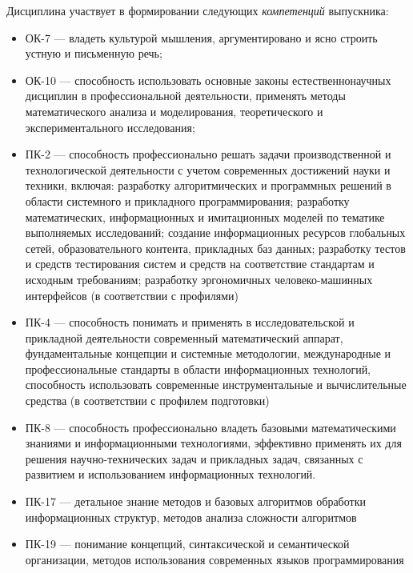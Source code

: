 \documentclass{rpd}
\begin{document}
    \bigskip Дисциплина участвует в формировании следующих \emph{компетенций} выпускника:
    \begin{itemize}
        \item
        ОК-7 --- владеть культурой мышления, аргументировано и ясно строить устную и письменную речь;
        \item
        ОК-10 --- способность использовать основные законы естественнонаучных дисциплин в профессиональной деятельности, применять методы математического анализа и моделирования, теоретического и экспериментального исследования;
        \item
        ПК-2 --- способность профессионально решать задачи производственной и технологической деятельности с учетом современных достижений науки и техники, включая: разработку алгоритмических и программных решений в области системного и прикладного программирования; разработку математических, информационных и имитационных моделей по тематике выполняемых исследований; создание информационных ресурсов глобальных сетей, образовательного контента, прикладных баз данных; разработку тестов и средств тестирования систем и средств на соответствие стандартам и исходным требованиям; разработку  эргономичных человеко-машинных интерфейсов (в соответствии с профилями)
        \item
        ПК-4 --- способность понимать и применять в исследовательской и прикладной деятельности современный математический аппарат, фундаментальные концепции и системные методологии, международные и профессиональные стандарты в области информационных технологий, способность использовать современные инструментальные и вычислительные средства (в соответствии с профилем подготовки)
        \item
        ПК-8 --- способность профессионально владеть базовыми математическими знаниями и информационными технологиями, эффективно применять их для решения научно-технических задач и прикладных задач, связанных с развитием и использованием информационных технологий.
        \item
        ПК-17 --- детальное знание методов и базовых алгоритмов обработки информационных структур, методов анализа сложности алгоритмов
        \item
        ПК-19 --- понимание концепций, синтаксической и семантической организации, методов использования современных языков программирования
    \end{itemize}
    
\end{document}
